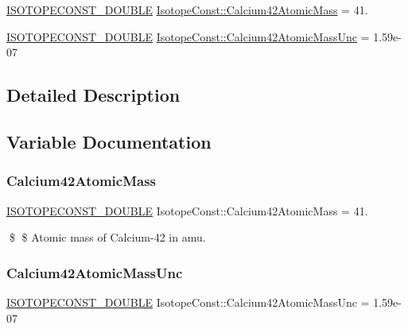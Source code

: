 \begin{DoxyCompactItemize}
\item 
\mbox{\hyperlink{group___isotope_const-_macros_ga8f45a7272ce02c0b4c65c44636ed719a}{I\+S\+O\+T\+O\+P\+E\+C\+O\+N\+S\+T\+\_\+\+D\+O\+U\+B\+LE}} \mbox{\hyperlink{group___isotope_const-_calcium-_ca42_gac212ffc0a48ed92968657e06b8ec47e9}{Isotope\+Const\+::\+Calcium42\+Atomic\+Mass}} = 41.
\item 
\mbox{\hyperlink{group___isotope_const-_macros_ga8f45a7272ce02c0b4c65c44636ed719a}{I\+S\+O\+T\+O\+P\+E\+C\+O\+N\+S\+T\+\_\+\+D\+O\+U\+B\+LE}} \mbox{\hyperlink{group___isotope_const-_calcium-_ca42_ga297fc7022bdaa852915aa6a2b67babb5}{Isotope\+Const\+::\+Calcium42\+Atomic\+Mass\+Unc}} = 1.\+59e-\/07
\end{DoxyCompactItemize}


\subsection{Detailed Description}


\subsection{Variable Documentation}
\mbox{\label{group___isotope_const-_calcium-_ca42_gac212ffc0a48ed92968657e06b8ec47e9}} 
\subsubsection{\texorpdfstring{Calcium42\+Atomic\+Mass}{Calcium42AtomicMass}}
{\footnotesize\ttfamily \mbox{\hyperlink{group___isotope_const-_macros_ga8f45a7272ce02c0b4c65c44636ed719a}{I\+S\+O\+T\+O\+P\+E\+C\+O\+N\+S\+T\+\_\+\+D\+O\+U\+B\+LE}} Isotope\+Const\+::\+Calcium42\+Atomic\+Mass = 41.}

\$ \$ Atomic mass of Calcium-\/42 in amu. \mbox{\label{group___isotope_const-_calcium-_ca42_ga297fc7022bdaa852915aa6a2b67babb5}} 
\subsubsection{\texorpdfstring{Calcium42\+Atomic\+Mass\+Unc}{Calcium42AtomicMassUnc}}
{\footnotesize\ttfamily \mbox{\hyperlink{group___isotope_const-_macros_ga8f45a7272ce02c0b4c65c44636ed719a}{I\+S\+O\+T\+O\+P\+E\+C\+O\+N\+S\+T\+\_\+\+D\+O\+U\+B\+LE}} Isotope\+Const\+::\+Calcium42\+Atomic\+Mass\+Unc = 1.\+59e-\/07}

